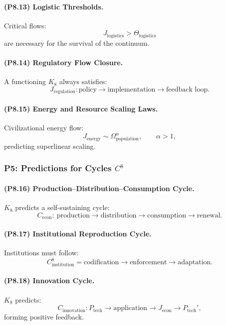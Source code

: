 \paragraph{(P8.13) Logistic Thresholds.}
Critical flows:
\[
J_{\mathrm{logistics}} > \Theta_{\mathrm{logistics}}
\]
are necessary for the survival of the continuum.

\paragraph{(P8.14) Regulatory Flow Closure.}
A functioning $K_8$ always satisfies:
\[
J_{\mathrm{regulation}}: \text{policy}
\to \text{implementation}
\to \text{feedback loop}.
\]

\paragraph{(P8.15) Energy and Resource Scaling Laws.}
Civilizational energy flow:
\[
J_{\mathrm{energy}} \sim \Omega_{\mathrm{population}}^\alpha,
\qquad
\alpha > 1,
\]
predicting superlinear scaling.

\subsubsection{P5: Predictions for Cycles $C^{8}$}

\paragraph{(P8.16) Production–Distribution–Consumption Cycle.}
$K_8$ predicts a self-sustaining cycle:
\[
C_{\mathrm{econ}}
: \
\text{production}
\to \text{distribution}
\to \text{consumption}
\to \text{renewal}.
\]

\paragraph{(P8.17) Institutional Reproduction Cycle.}
Institutions must follow:
\[
C_{\mathrm{institution}}^8
=
\text{codification}
\to \text{enforcement}
\to \text{adaptation}.
\]

\paragraph{(P8.18) Innovation Cycle.}
$K_8$ predicts:
\[
C_{\mathrm{innovation}}
: P_{\mathrm{tech}}
\to \text{application}
\to J_{\mathrm{econ}}
\to P_{\mathrm{tech}}',
\]
forming positive feedback.

